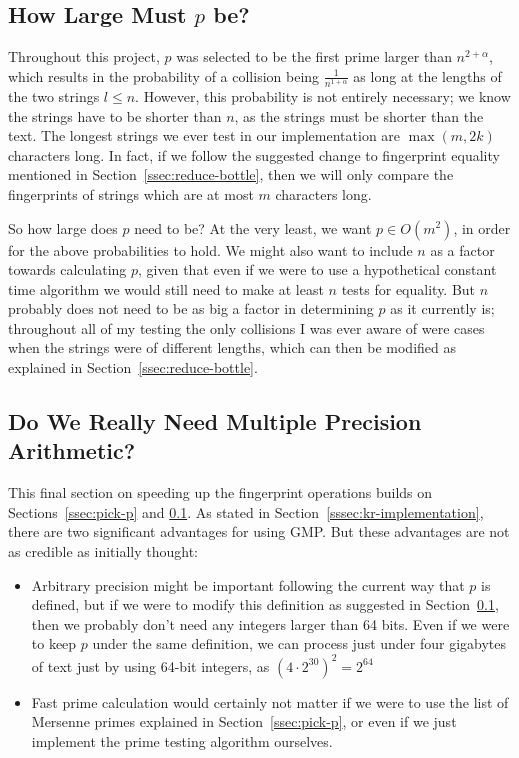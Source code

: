 \documentclass[ %
                    author={Dominic Joseph Moylett},
                    degree={MEng},
                     title={Dictionary Matching with Fingerprints},
                  subtitle={An Empirical Analysis},
                      type={research},
                      year={2015} ]{dissertation}
\begin{document}
\subsection{How Large Must $p$ be?}
\label{ssec:p-size}

Throughout this project, $p$ was selected to be the first prime larger than $n^{2 + \alpha}$, which results in the probability of a collision being $\frac{1}{n^{1 + \alpha}}$ as long at the lengths of the two strings $l \leq n$. However, this probability is not entirely necessary; we know the strings have to be shorter than $n$, as the strings must be shorter than the text. The longest strings we ever test in our implementation are $\max(m, 2k)$ characters long. In fact, if we follow the suggested change to fingerprint equality mentioned in Section~\ref{ssec:reduce-bottle}, then we will only compare the fingerprints of strings which are at most $m$ characters long.

So how large does $p$ need to be? At the very least, we want $p \in O(m^2)$, in order for the above probabilities to hold. We might also want to include $n$ as a factor towards calculating $p$, given that even if we were to use a hypothetical constant time algorithm we would still need to make at least $n$ tests for equality. But $n$ probably does not need to be as big a factor in determining $p$ as it currently is; throughout all of my testing the only collisions I was ever aware of were cases when the strings were of different lengths, which can then be modified as explained in Section~\ref{ssec:reduce-bottle}.

\subsection{Do We Really Need Multiple Precision Arithmetic?}
\label{ssec:do-we-need-mpa}

This final section on speeding up the fingerprint operations builds on Sections~\ref{ssec:pick-p} and \ref{ssec:p-size}. As stated in Section~\ref{sssec:kr-implementation}, there are two significant advantages for using GMP. But these advantages are not as credible as initially thought:

\begin{itemize}
  \item Arbitrary precision might be important following the current way that $p$ is defined, but if we were to modify this definition as suggested in Section~\ref{ssec:p-size}, then we probably don't need any integers larger than 64 bits. Even if we were to keep $p$ under the same definition, we can process just under four gigabytes of text just by using 64-bit integers, as $(4 \cdot 2^{30})^2 = 2^{64}$
  \item Fast prime calculation would certainly not matter if we were to use the list of Mersenne primes explained in Section~\ref{ssec:pick-p}, or even if we just implement the prime testing algorithm ourselves.
\end{itemize}
\end{document}
